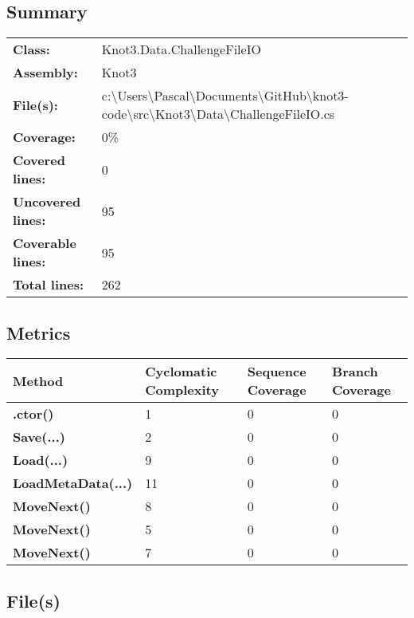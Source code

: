 \documentclass[a4paper,10pt]{article}
\begin{document}
\subsection{Summary}
\begin{longtable}[l]{ll}
\textbf{Class:} & Knot3.Data.ChallengeFileIO\\
\textbf{Assembly:} & Knot3\\
\textbf{File(s):} & \begin{minipage}[t]{12cm}{c:\textbackslash Users\textbackslash Pascal\textbackslash Documents\textbackslash GitHub\textbackslash knot3-code\textbackslash src\textbackslash Knot3\textbackslash Data\textbackslash ChallengeFileIO.cs}\end{minipage} \\
\textbf{Coverage:} & 0\%\\
\textbf{Covered lines:} & 0\\
\textbf{Uncovered lines:} & 95\\
\textbf{Coverable lines:} & 95\\
\textbf{Total lines:} & 262\\
\end{longtable}
\subsection{Metrics}
\begin{longtable}[l]{|l|l|l|l|}
\hline
\textbf{Method} & \textbf{Cyclomatic Complexity} & \textbf{Sequence Coverage} & \textbf{Branch Coverage}\\
\hline
\textbf{.ctor()} & 1 & 0 & 0\\
\hline
\textbf{Save(...)} & 2 & 0 & 0\\
\hline
\textbf{Load(...)} & 9 & 0 & 0\\
\hline
\textbf{LoadMetaData(...)} & 11 & 0 & 0\\
\hline
\textbf{MoveNext()} & 8 & 0 & 0\\
\hline
\textbf{MoveNext()} & 5 & 0 & 0\\
\hline
\textbf{MoveNext()} & 7 & 0 & 0\\
\hline
\end{longtable}
\subsection{File(s)}
\end{document}
